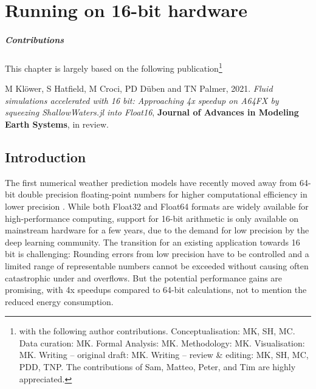 \chapter{Running on 16-bit hardware}
\label{chap:hardware}

{\small
\paragraph{Contributions} This chapter is largely based on the following publication\footnote{with the following author contributions.
Conceptualisation: MK, SH, MC. Data curation: MK. Formal Analysis: MK. Methodology: MK. Visualisation: MK. Writing – original draft:
MK. Writing – review \& editing: MK, SH, MC, PDD, TNP. The contributions of Sam, Matteo, Peter, and Tim are highly appreciated.}

\vspace{\baselineskip}
\indent M Klöwer, S Hatfield, M Croci, PD Düben and TN Palmer, 2021. \emph{Fluid simulations accelerated with 16 bit:
Approaching 4x speedup on A64FX by squeezing ShallowWaters.jl into Float16}, \textbf{Journal of Advances in Modeling
Earth Systems}, in review.
\vspace{\baselineskip}}

\section{Introduction}

The first numerical weather prediction models have recently moved away from 64-bit double precision floating-point numbers
for higher computational efficiency in lower precision \citep{Govett2017,Nakano2018,Rudisuhli2013,Vana2017}. While both Float32
and Float64 formats are widely available for high-performance computing, support for 16-bit arithmetic is only available on mainstream
hardware for a few years, due to the demand for low precision by the deep learning community. The transition for an existing application
towards 16 bit is challenging: Rounding errors from low precision have to be controlled and a limited range of representable numbers
cannot be exceeded without causing often catastrophic under and overflows. But the potential performance gains are promising,
with 4x speedups compared to 64-bit calculations, not to mention the reduced energy consumption.

